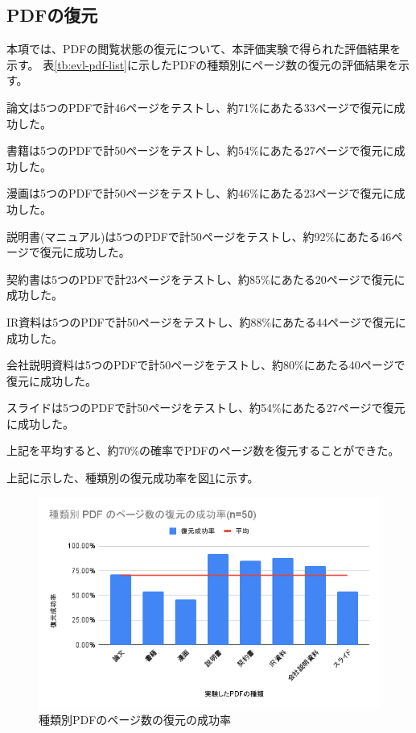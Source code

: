 \subsection{PDFの復元}
本項では、PDFの閲覧状態の復元について、本評価実験で得られた評価結果を示す。
表\ref{tb:evl-pdf-list}に示したPDFの種類別にページ数の復元の評価結果を示す。

論文は5つのPDFで計46ページをテストし、約71\%にあたる33ページで復元に成功した。

書籍は5つのPDFで計50ページをテストし、約54\%にあたる27ページで復元に成功した。

漫画は5つのPDFで計50ページをテストし、約46\%にあたる23ページで復元に成功した。

説明書(マニュアル)は5つのPDFで計50ページをテストし、約92\%にあたる46ページで復元に成功した。

契約書は5つのPDFで計23ページをテストし、約85\%にあたる20ページで復元に成功した。

IR資料は5つのPDFで計50ページをテストし、約88\%にあたる44ページで復元に成功した。

会社説明資料は5つのPDFで計50ページをテストし、約80\%にあたる40ページで復元に成功した。

スライドは5つのPDFで計50ページをテストし、約54\%にあたる27ページで復元に成功した。

上記を平均すると、約70\%の確率でPDFのページ数を復元することができた。

上記に示した、種類別の復元成功率を図\ref{fig:success-rate-pdf}に示す。


\begin{figure}[htbp]
  \label{fig:success-rate-pdf}
  \begin{center}
    \includegraphics[bb=0 0 600 371,width=15cm]{img/060_evaluation/result/pdf/success-rate-pdf.pdf}
  \end{center}
  \caption{種類別PDFのページ数の復元の成功率}
\end{figure}
